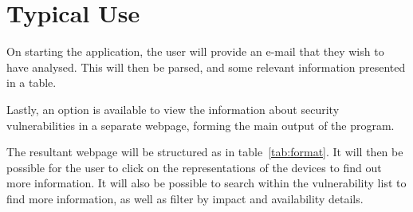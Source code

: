 \documentclass[a4paper,DIV=13,BCOR=7mm,abstract=yes,twoside,10pt]{scrreprt}
\begin{document}
  \section{Typical Use}

  On starting the application, the user will provide an e-mail that they wish
  to have analysed.  This will then be parsed, and some relevant information
  presented in a table.

  Lastly, an option is available to view the information about security
  vulnerabilities in a separate webpage, forming the main output of the
  program.

  The resultant webpage will be structured as in table~\ref{tab:format}.  It
  will then be possible for the user to click on the representations of the
  devices to find out more information.  It will also be possible to search
  within the vulnerability list to find more information, as well as filter by
  impact and availability details.
\end{document}
